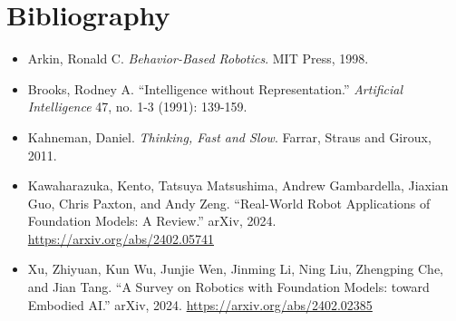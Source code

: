 \documentclass[11pt]{article}
\begin{document}
\section*{Bibliography}

\begin{itemize}
\item Arkin, Ronald C. \textit{Behavior-Based Robotics}. MIT Press, 1998.
\item Brooks, Rodney A. ``Intelligence without Representation.'' \textit{Artificial Intelligence} 47, no. 1-3 (1991): 139-159.
\item Kahneman, Daniel. \textit{Thinking, Fast and Slow}. Farrar, Straus and Giroux, 2011.
\item Kawaharazuka, Kento, Tatsuya Matsushima, Andrew Gambardella, Jiaxian Guo, Chris Paxton, and Andy Zeng. ``Real-World Robot Applications of Foundation Models: A Review.'' arXiv, 2024. \url{https://arxiv.org/abs/2402.05741}
\item Xu, Zhiyuan, Kun Wu, Junjie Wen, Jinming Li, Ning Liu, Zhengping Che, and Jian Tang. ``A Survey on Robotics with Foundation Models: toward Embodied AI.'' arXiv, 2024. \url{https://arxiv.org/abs/2402.02385}
\end{itemize}
\end{document}
